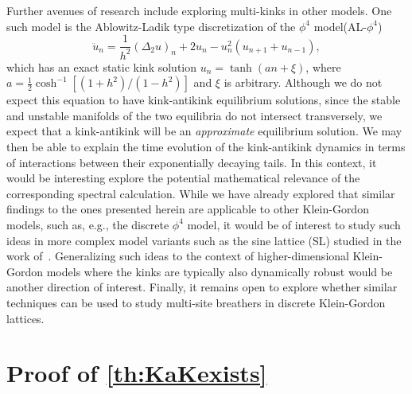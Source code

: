 \documentclass[12pt,reqno]{amsart}
\begin{document}
Further avenues of research include exploring multi-kinks in other models. One such model is the Ablowitz-Ladik type discretization of the $\phi^4$ model(AL-$\phi^4$) \cite{kevrekidis2003}
\begin{equation}
	\ddot{u}_n = \frac{1}{h^2}(\Delta_2 u)_n + 2 u_n - u_n^2 (u_{n+1}+u_{n-1}),
\end{equation}
which has an exact static kink solution $u_n = \tanh(a n + \xi)$, where $a = \frac{1}{2} \cosh^{-1}[(1+h^2)/(1-h^2) ]$ and $\xi$ is arbitrary. Although we do not expect this equation to have kink-antikink equilibrium solutions, since the stable and unstable manifolds of the two equilibria do not intersect transversely, we expect that a kink-antikink will be an {\it approximate} equilibrium solution. We may then be able to explain the time evolution of the kink-antikink dynamics in terms of interactions between their exponentially decaying tails. 
In this context, it would be interesting explore the
potential mathematical relevance of the corresponding
spectral calculation.
While we have already explored
that similar findings to the ones presented herein
are applicable to other Klein-Gordon models, such as,
e.g., the discrete $\phi^4$ model, it would be of
interest to study such ideas in more complex model variants 
such as the sine lattice (SL) studied in the work
of~\cite{Takeno1986}. 
Generalizing such ideas to the context of higher-dimensional
Klein-Gordon models where the kinks are typically also 
dynamically robust would be another direction of interest.
Finally, it remains open to explore whether similar techniques 
can be used to study multi-site breathers in discrete 
Klein-Gordon lattices.

\section{Proof of \cref{th:KaKexists}}\label{sec:proof1}
\end{document}
